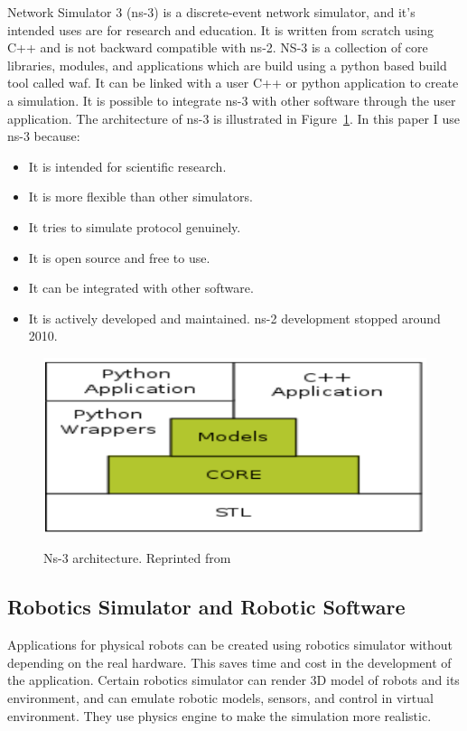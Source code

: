 Network Simulator 3 (ns-3) is a discrete-event network simulator, and it's intended uses are for research and education. It is written from scratch using C++ and is not backward compatible with ns-2. NS-3 is a collection of core libraries, modules, and applications which are build using a python based build tool called waf. It can be linked with a user C++ or python application to create a simulation. It is possible to integrate ns-3 with other software through the user application. The architecture of ns-3 is illustrated in Figure~\ref{fig:ns3-architecture}. In this paper I use ns-3 because:
\begin{itemize}
	\item It is intended for scientific research.
	\item It is more flexible than other simulators.
	\item It tries to simulate protocol genuinely.
	\item It is open source and free to use.
	\item It can be integrated with other software.
	\item It is actively developed and maintained. ns-2 development stopped around 2010.
\end{itemize}

\begin{figure}
	\centering
	\caption[Ns-3 architecture]{\small 
		Ns-3 architecture. Reprinted from  }
	\includegraphics[width=5in]{figures/literature/ns3-architecture}
	\label{fig:ns3-architecture}
\end{figure}

\subsection{Robotics Simulator and Robotic Software}

Applications for physical robots can be created using robotics simulator without depending on the real hardware. This saves time and cost in the development of the application. Certain robotics simulator can render 3D model of robots and its environment, and can emulate robotic models, sensors, and control in virtual environment. They use physics engine to make the simulation more realistic.


